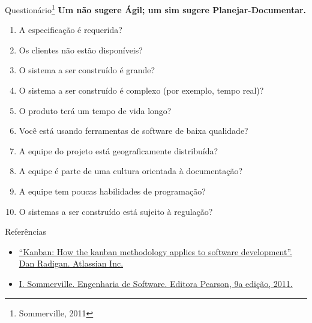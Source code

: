 \begin{frame}{Questionário\footnote{Sommerville, 2011}}\small
  {\bf Um não sugere Ágil; um sim sugere Planejar-Documentar.}\\
  \begin{enumerate}
  \item A especificação é requerida?
  \item Os clientes não estão disponíveis?
  \item O sistema a ser construído é grande?
  \item O sistema a ser construído é complexo (por exemplo, tempo real)?
  \item O produto terá um tempo de vida longo?
  \item Você está usando ferramentas de software de baixa qualidade?
  \item A equipe do projeto está geograficamente distribuída?
  \item A equipe é parte de uma cultura orientada à documentação?
  \item A equipe tem poucas habilidades de programação?
  \item O sistemas a ser construído está sujeito à regulação?
  \end{enumerate}

\end{frame}

\begin{frame}{Referências}
  \begin{itemize}
  \item \href{https://www.atlassian.com/agile/kanban}{``Kanban: How
      the kanban methodology applies to software development''.  Dan
      Radigan. Atlassian Inc.}
  \item
    \href{https://feituverava.bv3.digitalpages.com.br/users/publications/9788579361081}{I. Sommerville. Engenharia
      de Software. Editora Pearson, 9a edição, 2011.}
  \end{itemize}
\end{frame}
